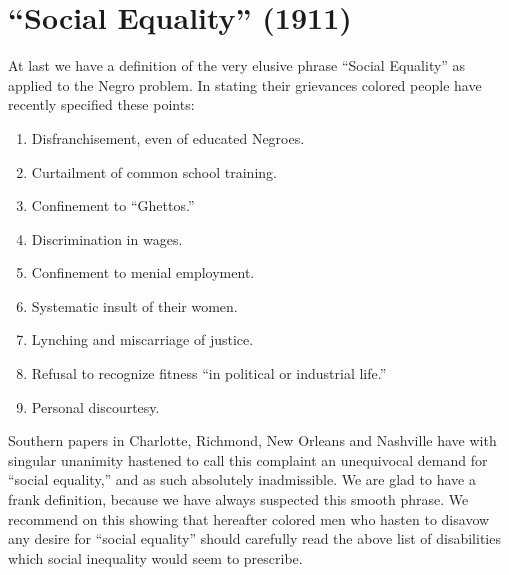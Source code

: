 \documentclass[letterpaper,10pt,english]{jupyterBook}
\begin{document}
\section{“Social Equality” (1911)}
\label{\detokenize{Volumes/01/03/social_equality:social-equality-1911}}\label{\detokenize{Volumes/01/03/social_equality::doc}}
\sphinxAtStartPar
At last we have a definition of the very elusive phrase “Social Equality” as applied to the Negro problem. In stating their grievances colored people have recently specified these points:
\begin{enumerate}
%
\item {} 
\sphinxAtStartPar
Disfranchisement, even of educated Negroes.

\item {} 
\sphinxAtStartPar
Curtailment of common school training.

\item {} 
\sphinxAtStartPar
Confinement to “Ghettos.”

\item {} 
\sphinxAtStartPar
Discrimination in wages.

\item {} 
\sphinxAtStartPar
Confinement to menial employment.

\item {} 
\sphinxAtStartPar
Systematic insult of their women.

\item {} 
\sphinxAtStartPar
Lynching and miscarriage of justice.

\item {} 
\sphinxAtStartPar
Refusal to recognize fitness “in political or industrial life.”

\item {} 
\sphinxAtStartPar
Personal discourtesy.

\end{enumerate}

\sphinxAtStartPar
Southern papers in Charlotte, Richmond, New Orleans and Nashville have with singular unanimity hastened to call this complaint an unequivocal demand for “social equality,” and as such absolutely inadmissible. We are glad to have a frank definition, because we have always suspected this smooth phrase. We recommend on this showing that hereafter colored men who hasten to disavow any desire for “social equality” should carefully read the above list of disabilities which social inequality would seem to prescribe.
\end{document}
